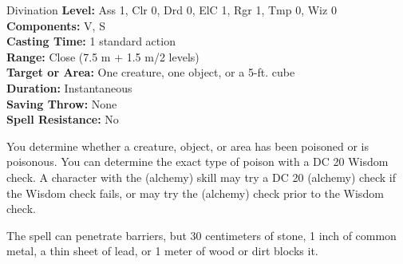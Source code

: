 {Divination}
{
	\textbf{Level:}
	Ass 1, Clr 0, Drd 0, ElC 1, Rgr 1, Tmp 0, Wiz 0\\
	\textbf{Components:}
	V, S\\
	\textbf{Casting Time:}
	1 standard action\\
	\textbf{Range:}
	Close (7.5 m + 1.5 m/2 levels)\\
	\textbf{Target or Area:}
	One creature, one object, or a 5-ft. cube\\
	\textbf{Duration:}
	Instantaneous\\
	\textbf{Saving Throw:}
	None\\
	\textbf{Spell Resistance:}
	No\\
}
{
	You determine whether a creature, object, or area has been poisoned or is poisonous. You can determine the exact type of poison with a DC 20 Wisdom check. A character with the  (alchemy) skill may try a DC 20  (alchemy) check if the Wisdom check fails, or may try the  (alchemy) check prior to the Wisdom check.

	The spell can penetrate barriers, but 30 centimeters of stone, 1 inch of common metal, a thin sheet of lead, or 1 meter of wood or dirt blocks it.

}
